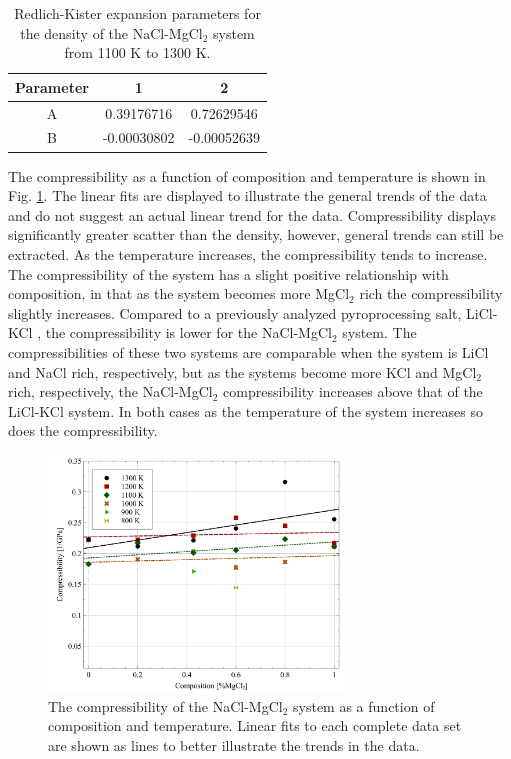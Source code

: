 \documentclass[review]{elsarticle}
\begin{document}
\begin{table}[]
\centering
\caption{Redlich-Kister expansion parameters for the density of the NaCl-MgCl$_2$ system from 1100 K to 1300 K.}
\begin{tabular}{|c|c|c|}
\hline
Parameter &1 & 2 \\
\hline
A	& 0.39176716      & 0.72629546\\
B	  & -0.00030802	      & -0.00052639\\
\hline
\end{tabular}
\label{table:RK_parameters}
\end{table}

\FloatBarrier

The compressibility as a function of composition and temperature is shown in Fig. \ref{fig:compressibility}. The linear fits are displayed to illustrate the general trends of the data and do not suggest an actual linear trend for the data. Compressibility displays significantly greater scatter than the density, however, general trends can still be extracted. As the temperature increases, the compressibility tends to increase. The compressibility of the system has a slight positive relationship with composition, in that as the system becomes more MgCl$_2$ rich the compressibility slightly increases. Compared to a previously analyzed pyroprocessing salt, LiCl-KCl \cite{Duemmler2021}, the compressibility is lower for the NaCl-MgCl$_2$ system. The compressibilities of these two systems are comparable when the system is LiCl and NaCl rich, respectively, but as the systems become more KCl and MgCl$_2$ rich, respectively, the NaCl-MgCl$_2$ compressibility increases above that of the LiCl-KCl system. In both cases as the temperature of the system increases so does the compressibility.

\begin{figure}[h]
 \centering
 \includegraphics[width=0.7\textwidth]{images/compressibility.jpg} 
 \caption{The compressibility of the NaCl-MgCl$_2$ system as a function of composition and temperature. Linear fits to each complete data set are shown as lines to better illustrate the trends in the data. }
 \label{fig:compressibility}
\end{figure} 
\end{document}
